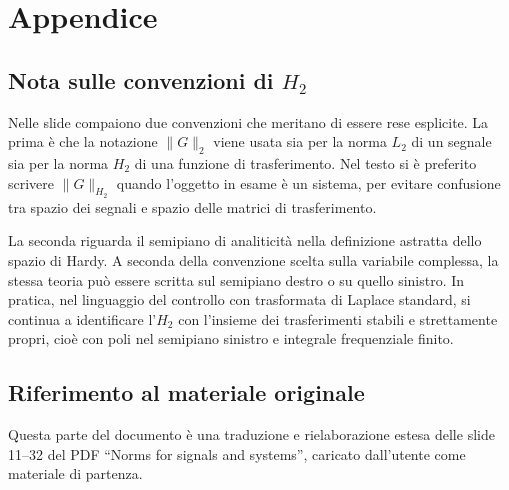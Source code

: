 \documentclass[11pt,a4paper]{article}
\begin{document}
\clearpage
{}
\section*{Appendice}

\subsection*{Nota sulle convenzioni di \texorpdfstring{$H_2$}{H2}}
{}

Nelle slide compaiono due convenzioni che meritano di essere rese esplicite. La prima \`e che la notazione $\|G\|_2$ viene usata sia per la norma $L_2$ di un segnale sia per la norma $H_2$ di una funzione di trasferimento. Nel testo si \`e preferito scrivere $\|G\|_{H_2}$ quando l'oggetto in esame \`e un sistema, per evitare confusione tra spazio dei segnali e spazio delle matrici di trasferimento.

La seconda riguarda il semipiano di analiticit\`a nella definizione astratta dello spazio di Hardy. A seconda della convenzione scelta sulla variabile complessa, la stessa teoria pu\`o essere scritta sul semipiano destro o su quello sinistro. In pratica, nel linguaggio del controllo con trasformata di Laplace standard, si continua a identificare l'$H_2$ con l'insieme dei trasferimenti stabili e strettamente propri, cio\`e con poli nel semipiano sinistro e integrale frequenziale finito.

\subsection*{Riferimento al materiale originale}
{}

Questa parte del documento \`e una traduzione e rielaborazione estesa delle slide 11--32 del PDF ``Norms for signals and systems'', caricato dall'utente come materiale di partenza.
\end{document}

